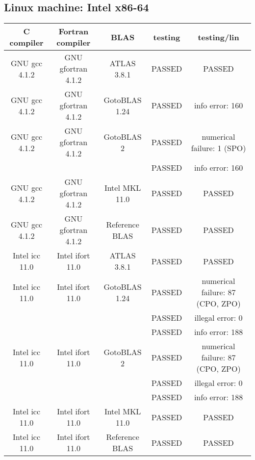 \subsection{Linux machine: Intel x86-64}
\begin{tabular}{| c | c | c | c | c |}
\hline
C compiler & Fortran compiler & BLAS                & testing     &  testing/lin \\ 
\hline \hline
GNU gcc	4.1.2      & GNU gfortran 4.1.2    & ATLAS 3.8.1         &       PASSED      &       PASSED                  \\ \hline
GNU gcc 4.1.2      & GNU gfortran 4.1.2    & GotoBLAS 1.24       &       PASSED      & info error:        160        \\ \hline
GNU gcc 4.1.2      & GNU gfortran 4.1.2    & GotoBLAS 2          &       PASSED      & numerical failure: 1 (SPO)    \\
                   &                       &                     &       PASSED      & info error:        160        \\ \hline
GNU gcc 4.1.2      & GNU gfortran 4.1.2    & Intel MKL 11.0      &       PASSED      &       PASSED                  \\ \hline
GNU gcc 4.1.2      & GNU gfortran 4.1.2    & Reference BLAS      &       PASSED      &       PASSED                  \\ \hline
Intel icc 11.0     & Intel ifort 11.0      & ATLAS 3.8.1         &       PASSED      &       PASSED                  \\ \hline
Intel icc 11.0     & Intel ifort 11.0      & GotoBLAS 1.24       &       PASSED      & numerical failure: 87 (CPO, ZPO)   \\
                   &                       &                     &       PASSED      & illegal error:     0          \\ 
                   &                       &                     &       PASSED      & info error:        188        \\ \hline
Intel icc 11.0     & Intel ifort 11.0      & GotoBLAS 2          &       PASSED      & numerical failure: 87 (CPO, ZPO)   \\
                   &                       &                     &       PASSED      & illegal error:     0          \\ 
                   &                       &                     &       PASSED      & info error:        188        \\ \hline
Intel icc 11.0     & Intel ifort 11.0      & Intel MKL 11.0      &       PASSED      &       PASSED                  \\ \hline
Intel icc 11.0     & Intel ifort 11.0      & Reference BLAS      &       PASSED      &       PASSED                  \\ \hline
\end{tabular} 

